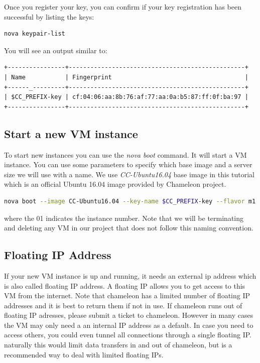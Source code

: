 Once you register your key, you can confirm if your key registration
has been successful by listing the keys:

\begin{lstlisting}[language=bash]
nova keypair-list
\end{lstlisting}

You will see an output similar to:

\begin{lstlisting}
+----------------+-------------------------------------------------+
| Name           | Fingerprint                                     |
+------_---------+-------------------------------------------------+
| $CC_PREFIX-key | cf:04:06:aa:8b:76:af:77:aa:0a:b5:87:ff:0f:ba:97 |
+----------------+-------------------------------------------------+
\end{lstlisting}


\subsection{Start a new VM instance}

To start new instances you can use the \textit{nova boot} command. It
will start a VM instance. You can use some parameters to specify which
base image and a server size we will use with a name. We use
\textit{CC-Ubuntu16.04} base image in this tutorial which is an
official Ubuntu 16.04 image provided by Chameleon project.

\begin{lstlisting}[language=bash]
nova boot --image CC-Ubuntu16.04 --key-name $CC_PREFIX-key --flavor m1.small $CC_PREFIX-01
\end{lstlisting}

where the 01 indicates the instance number. Note that we will be
terminating and deleting any VM in our project that does not follow
this naming convention.

\subsection{Floating IP Address}

If your new VM instance is up and running, it needs an external ip
address which is also called floating IP address. A floating IP allows
you to get access to this VM from the internet. Note that chameleon
has a limited number of floating IP addresses and it is best to return
them if not in use. If chameleon runs out of floating IP adresses,
please submit a ticket to chameleon. However in many cases the VM may
only need a an internal IP address as a default. In case you need to
access others, you could even tunnel all connections through a single
floating IP. naturally this would limit data transfers in and out of
chameleon, but is a recommended way to deal with limited floating IPs.


